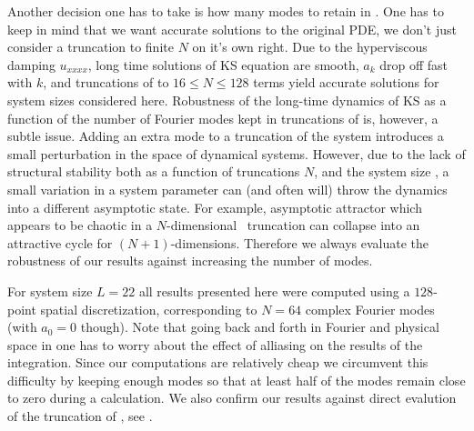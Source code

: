 Another decision one has to take is how many modes to retain in . One
has to keep in mind that we want accurate solutions to the original PDE, we don't just
consider a truncation to finite $N$ on it's own right. Due to the hyperviscous 
damping $u_{xxxx}$, long time solutions of KS
equation are smooth, $a_k$ drop off fast
with $k$, and truncations of  to $16 \leq N \leq 128$
terms yield accurate solutions for system sizes considered here.
Robustness of the long-time dynamics of KS as a function of the 
number of Fourier modes kept in truncations
of  is, however, a subtle issue.  Adding an extra mode to
a truncation of the system introduces a small perturbation in the
space of dynamical systems.  However, due to the lack of structural
stability both as a function of truncations $N$, and the system size
\tildeL, a small variation in a system parameter can (and often will)
throw the dynamics into a different asymptotic state.  For example,
asymptotic attractor which appears to be chaotic in a $N$-dimensional
\statesp\ truncation can collapse into an attractive cycle
for $(N\!+\!1)$-dimensions. Therefore we always evaluate the robustness
of our results against increasing the number of modes. 

For system size $L=22$ all results presented here were computed using
a $128$-point spatial discretization, corresponding to $N=64$ complex Fourier modes
(with $a_0=0$ though). Note that going back and forth in Fourier and physical
space in  one has to worry about the effect of alliasing
on the results of the integration. Since our computations are relatively cheap
we circumvent this difficulty by keeping enough modes so that at least half
of the modes remain close to zero during a calculation. We also confirm our
results against direct evalution of the truncation of , see .



% 

